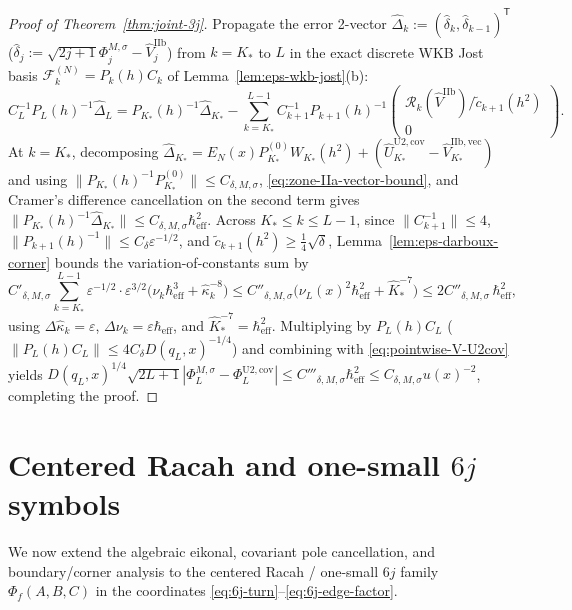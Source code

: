 \documentclass[11pt]{article}
\theoremstyle{definition}
\theoremstyle{remark}
\newcommand{\cR}{\mathcal{R}}
\newcommand{\heff}{\hbar_{\mathrm{eff}}}
\renewcommand{\_}{\oldunderscore\penalty0\hskip0pt\relax}
\begin{document}
\begin{proof}[Proof of Theorem~\ref{thm:joint-3j}]
Propagate the error 2-vector $\widehat{\Delta}_k:=(\widehat{\delta}_k,\widehat{\delta}_{k-1})^{\mathsf{T}}$
  ($\widehat{\delta}_j:=\sqrt{2j+1}\Phi_j^{M,\sigma}-\widehat{V}_j^{\mathrm{IIb}}$) from $k=K_*$ to $L$ in the exact discrete WKB
  Jost basis $\mathcal{F}_k^{(N)}=P_k(h)C_k$ of Lemma~\ref{lem:eps-wkb-jost}(b):
\begin{equation}
  C_L^{-1}P_L(h)^{-1}\widehat{\Delta}_L = P_{K_*}(h)^{-1}\widehat{\Delta}_{K_*} -
    \sum_{k=K_*}^{L-1}C_{k+1}^{-1}P_{k+1}(h)^{-1}\begin{pmatrix}\cR_k(\widehat{V}^{\mathrm{IIb}})/\tilde{c}_{k+1}(h^2)\\
    0\end{pmatrix}.
\end{equation}
At $k=K_*$, decomposing
  $\widehat{\Delta}_{K_*}=E_N(x)P_{K_*}^{(0)}W_{K_*}(h^2)+(\widehat{U}_{K_*}^{\mathrm{U2,cov}}-\widehat{V}_{K_*}^{\mathrm{IIb},\mathrm{vec}})$
  and using $\|P_{K_*}(h)^{-1}P_{K_*}^{(0)}\|\le C_{\delta,M,\sigma}$, \eqref{eq:zone-IIa-vector-bound}, and Cramer's difference
  cancellation on the second term gives $\|P_{K_*}(h)^{-1}\widehat{\Delta}_{K_*}\|\le C_{\delta,M,\sigma}\heff^2$. Across $K_*\le
  k\le L-1$, since $\|C_{k+1}^{-1}\|\le 4$, $\|P_{k+1}(h)^{-1}\|\le C_\delta\varepsilon^{-1/2}$, and
  $\tilde{c}_{k+1}(h^2)\ge\frac14\sqrt{\delta}$, Lemma~\ref{lem:eps-darboux-corner} bounds the variation-of-constants sum by
\begin{equation}
  C'_{\delta,M,\sigma}\sum_{k=K_*}^{L-1}\varepsilon^{-1/2}\cdot\varepsilon^{3/2}\bigl(\nu_k\heff^3+\hat{\kappa}_k^{-8}\bigr) \le
    C''_{\delta,M,\sigma}\bigl(\nu_L(x)^2\heff^2 + \hat{K}_*^{-7}\bigr) \le 2C''_{\delta,M,\sigma}\,\heff^2,
\end{equation}
using $\Delta\hat{\kappa}_k=\varepsilon$, $\Delta\nu_k=\varepsilon\heff$, and $\hat{K}_*^{-7}=\heff^2$. Multiplying by
  $P_L(h)C_L$ ($\|P_L(h)C_L\|\le 4C_\delta D(q_L,x)^{-1/4}$) and combining with \eqref{eq:pointwise-V-U2cov} yields
  $D(q_L,x)^{1/4}\sqrt{2L+1}|\Phi_L^{M,\sigma}-\Phi_L^{\mathrm{U2,cov}}|\le C'''_{\delta,M,\sigma}\heff^2\le
  C_{\delta,M,\sigma}u(x)^{-2}$, completing the proof.
\end{proof}

\section{Centered Racah and one-small \texorpdfstring{$6j$}{6j} symbols}
\label{sec:racah-6j}

We now extend the algebraic eikonal, covariant pole cancellation, and boundary/corner analysis to the centered Racah / one-small
  $6j$ family $\Phi_f(A,B,C)$ in the coordinates \eqref{eq:6j-turn}--\eqref{eq:6j-edge-factor}.
\end{document}
